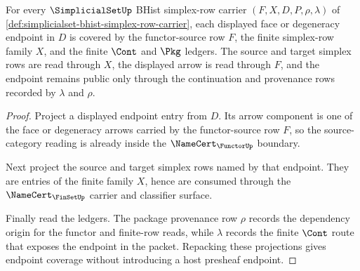 \begin{theorem}
\label{thm:simplicialset-face-degeneracy-endpoint-coverage}
For every $\SimplicialSetUp$ BHist simplex-row carrier
$(F,X,D,P,\rho,\lambda)$ of
\autoref{def:simplicialset-bhist-simplex-row-carrier}, each displayed face
or degeneracy endpoint in $D$ is covered by the functor-source row $F$, the
finite simplex-row family $X$, and the finite $\Cont$ and $\Pkg$ ledgers.
The source and target simplex rows are read through $X$, the displayed arrow
is read through $F$, and the endpoint remains public only through the
continuation and provenance rows recorded by $\lambda$ and $\rho$.
\end{theorem}
\begin{proof}
Project a displayed endpoint entry from $D$. Its arrow component is one of the
face or degeneracy arrows carried by the functor-source row $F$, so the
source-category reading is already inside the $\NameCert_{\FunctorUp}$
boundary.

Next project the source and target simplex rows named by that endpoint. They
are entries of the finite family $X$, hence are consumed through the
$\NameCert_{\FinSetUp}$ carrier and classifier surface.

Finally read the ledgers. The package provenance row $\rho$ records the
dependency origin for the functor and finite-row reads, while $\lambda$
records the finite $\Cont$ route that exposes the endpoint in the packet.
Repacking these projections gives endpoint coverage without introducing a
host presheaf endpoint.
\end{proof}

